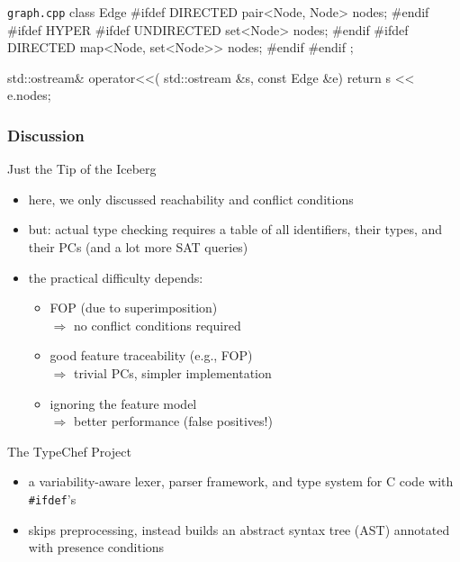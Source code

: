 \begin{frame}[fragile]{\myframetitle}
\begin{fancycolumns}[columns=3,widths={37,29,34},animation=none]
\begin{cpptight}[basicstyle=\small]{\texttt{graph.cpp}}
class Edge {
#ifdef DIRECTED
	pair<Node, Node> nodes;
#endif
#ifdef HYPER
#ifdef UNDIRECTED
	set<Node> nodes;
#endif
#ifdef DIRECTED
	map<Node, set<Node>> nodes;
#endif
#endif
};

std::ostream& operator<<(
	std::ostream &s, const Edge &e) {
	return s << e.nodes;
}
		\end{cpptight}
	\end{fancycolumns}
\end{frame}

\subsubsection{Discussion}

\begin{frame}{\myframetitle}
	\begin{fancycolumns}
		\begin{note}{Just the Tip of the Iceberg}
			\begin{itemize}
				\item here, we only discussed reachability and conflict conditions
				\item but: actual type checking requires a table of all identifiers, their types, and their PCs (and a lot more SAT queries)
				\item the practical difficulty depends:
				\begin{itemize}
					\item FOP (due to superimposition)\\
						$\Rightarrow$ no conflict conditions required
					\item good feature traceability (e.g., FOP)\\
						$\Rightarrow$ trivial PCs, simpler implementation
					\item ignoring the feature model\\
						$\Rightarrow$ better performance (false positives!)
				\end{itemize}
			\end{itemize}
		\end{note}
	\nextcolumn{}
		\begin{example}{The TypeChef Project \mysource{\typechef}}
			\begin{itemize}
				\item a variability-aware lexer, parser framework, and type system for C code with \texttt{\#ifdef}'s
				\item skips preprocessing, instead builds an abstract syntax tree (AST) annotated with presence conditions

\end{itemize}
\end{example}
\end{fancycolumns}
\end{frame}
